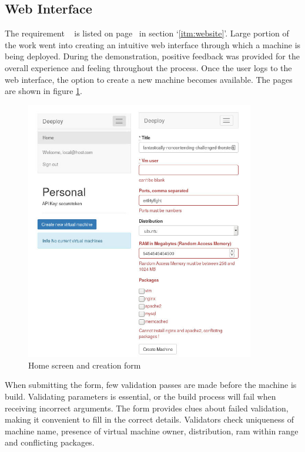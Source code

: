 \documentclass{article}
\begin{document}
\subsection{Web Interface}
The requirement ~  is listed on page~\pageref{itm:website} in section `\ref{itm:website}'.
Large portion of the work went into creating an intuitive web interface through which a machine is being deployed. During the demonstration, positive feedback was provided for the overall experience and feeling throughout the process.
Once the user logs to the web interface, the option to create a new machine becomes available. The pages are shown in figure \ref{fig:welcome_screen_deeploy}.

\begin{figure}[H]
	\vspace{0.5cm}
	\includegraphics[width=10cm]{build_form.jpg}
	\vspace{0.5cm}
	\caption{Home screen and creation form}
	\label{fig:welcome_screen_deeploy}
\end{figure}

When submitting the form, few validation passes are made before the machine is build. Validating parameters is essential, or the build process will fail when receiving incorrect arguments. The form provides clues about failed validation, making it convenient to fill in the correct details.
Validators check uniqueness of machine name, presence of virtual machine owner, distribution, \gls{ram} within range and conflicting packages.
\end{document}
